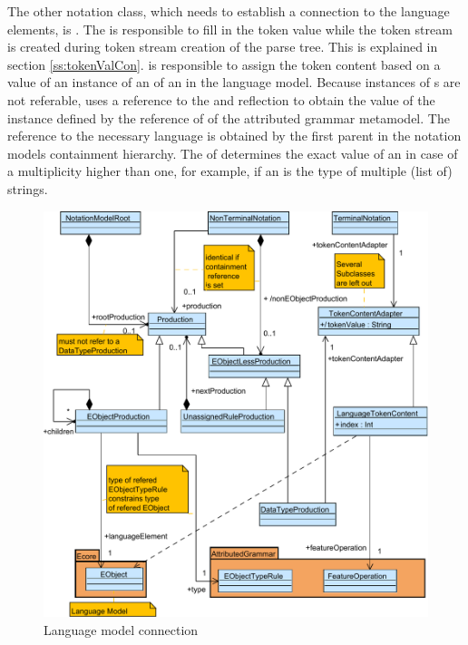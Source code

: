 The other notation class, which needs to establish a connection to the language elements, is . The  is responsible to fill in the token value while the token stream is created during token stream creation of the parse tree. This is explained in section \ref{ss:tokenValCon}.  is responsible to assign the token content based on a value of an instance of an  of an  in the language model. Because instances of s are not referable,  uses a reference to the  and reflection to obtain the value of the  instance defined by the  reference of  of the attributed grammar metamodel. The reference to the necessary language  is obtained by the first parent  in the notation models containment hierarchy. The  of  determines the exact value of an  in case of a multiplicity higher than one, for example, if an  is the type of multiple (list of) strings. 

\begin{figure}
\centering
\includegraphics[scale=0.8]{gfx/ex/Notation_LangRel} 
\caption{Language model connection}
\label{MM:Not:LR}
\end{figure}

